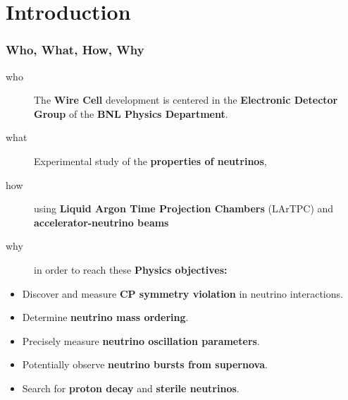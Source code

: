 \documentclass[xcolor=dvipsnames]{beamer}
\begin{document}




\section {Introduction}

\begin{frame}
  \frametitle{Who, What, How, Why}

  \begin{description}
  \item[who] The \textbf{Wire Cell} development is centered in the
    \textbf{Electronic Detector Group} of the \textbf{BNL Physics
      Department}.
  \item[what] Experimental study of the \textbf{properties of
      neutrinos},
  \item[how] using \textbf{Liquid Argon Time
      Projection Chambers} (LArTPC) and \textbf{accelerator-neutrino beams}
  \item[why] in order to reach these \textbf{Physics objectives:}
  \end{description}
  \begin{itemize}
  \item Discover and measure \textbf{CP symmetry violation} in neutrino interactions.
  \item Determine \textbf{neutrino mass ordering}.
  \item Precisely measure \textbf{neutrino oscillation parameters}.
  \item Potentially observe \textbf{neutrino bursts from supernova}.
  \item Search for \textbf{proton decay} and \textbf{sterile neutrinos}.
  \end{itemize}
\end{frame}
\end{document}

